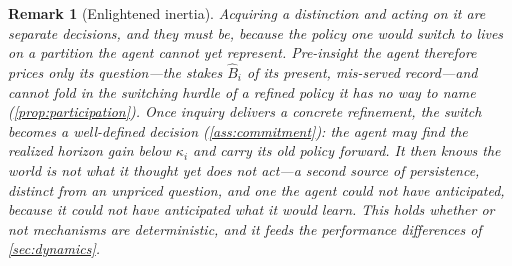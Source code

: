 \documentclass[11pt]{article}
\newtheorem{remark}[assumption]{Remark}
\theoremstyle{definition}
\begin{document}
\begin{remark}[Enlightened inertia]
\label{rem:stickiness}
Acquiring a distinction and acting on it are separate decisions, and they must be, because the policy one would switch to lives on a partition the agent cannot yet represent.
Pre-insight the agent therefore prices only its question---the stakes $\widehat B_i$ of its present, mis-served record---and cannot fold in the switching hurdle of a refined policy it has no way to name (\cref{prop:participation}).
Once inquiry delivers a concrete refinement, the switch becomes a well-defined decision (\cref{ass:commitment}): the agent may find the realized horizon gain below $\kappa_i$ and carry its old policy forward.
It then knows the world is not what it thought yet does not act---a second source of persistence, distinct from an unpriced question, and one the agent could not have anticipated, because it could not have anticipated what it would learn.
This holds whether or not mechanisms are deterministic, and it feeds the performance differences of \cref{sec:dynamics}.
\end{remark}
\end{document}
